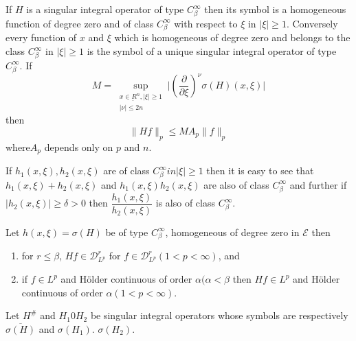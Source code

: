 \setcounter{theorem}{0}
\begin{theorem}\label{chap3-sec4-thm1}%
 If $H$ is a singular integral operator of
  type $C^\infty_\beta$ then its symbol is a homogeneous function of
  degree zero and of class $C^\infty_\beta$ with respect to $\xi$ in
  $| \xi | \geq 1$. Conversely every function of $x$ and $ \xi$ which
  is homogeneous of degree zero and belongs to the class $
  C^\infty_\beta$ in $| \xi| \geq 1$  is the symbol of a unique singular 
  integral operator of type $ C^\infty_\beta$. If  
$$
M = \sup_{\substack{x \in \underbar{R}^{n}, | \xi | \geq 1 \\ | \nu |
    \leq 2n}}  \big|(\frac{\partial}{\partial \xi})^\nu \sigma (H) (x,
\xi) \big| 
$$
then 
\begin{equation*}
\parallel H f \parallel_p \leq M A_p \parallel f \parallel_p
\tag{4.12}\label{chap4-eq4.12} 
\end{equation*}
where\pageoriginale $A_p$ depends only on $p$ and $n$. 
\end{theorem}

If $h_1 (x, \xi ), h_2 (x, \xi )$ are of class $ C^\infty _\beta in |
\xi| \geq 1$ then it is easy to see that $  h_1 (x, \xi ) +  h_2 (x,
\xi )$ and $  h_1 (x, \xi ) h_2 (x, \xi )$ are also of class $
C^\infty _\beta$ and further if $ | h_2 (x, \xi ) | \geq \delta > 0$
then  $ \dfrac{h_1 (x, \xi)}{h_2 (x, \xi)}$ is also of class $
C^\infty _\beta$.  

\begin{theorem}\label{chap3-sec4-thm2}%
 Let $ h(x, \xi) = \sigma (H)$ be of type $ C^\infty_\beta$,
 homogeneous of degree zero in $\mathscr{E}$ then  
\begin{enumerate}
\renewcommand{\labelenumi}{\rm(\theenumi)}
\item for $r \leq \beta$, $Hf \in \mathscr{D}^r_{L^p}$ for $f \in
  \mathscr{D}^r_{L^p} (1< p< \infty)$, and  

\item if $f \in L^p$ and H\"older continuous of order $\alpha
  (\alpha < \beta $ then $ Hf \in L^p $ and H\"older continuous of
  order $ \alpha (1 < p < \infty)$. 
\end{enumerate} 
\end{theorem}

Let $ H^\#$ and $H_1 0 H_2 $ be singular integral operators whose
symbols are respectively $\overline{\sigma (H)}$ and $ \sigma
(H_1)$. $\sigma (H_2)$.  

